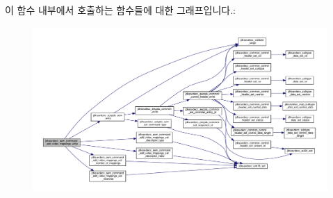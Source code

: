 이 함수 내부에서 호출하는 함수들에 대한 그래프입니다.\+:
\nopagebreak
\begin{figure}[H]
\begin{center}
\leavevmode
\includegraphics[width=350pt]{group__command__add__video__mappings_ga1bd31714358845eaab8257a655079d46_cgraph}
\end{center}
\end{figure}


